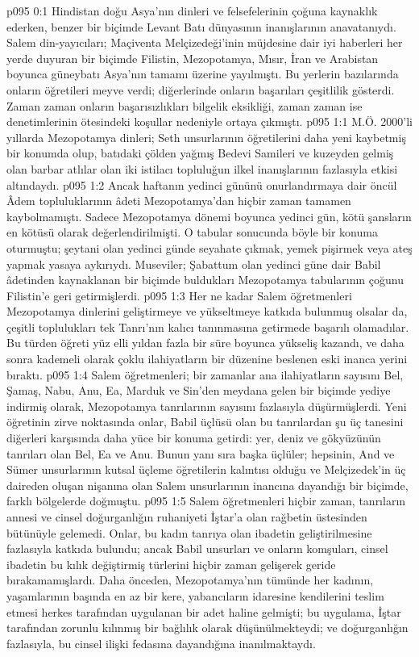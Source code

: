 \vs p095 0:1 Hindistan doğu Asya’nın dinleri ve felsefelerinin çoğuna kaynaklık ederken, benzer bir biçimde Levant Batı dünyasının inanışlarının anavatanıydı. Salem din\hyp{}yayıcıları; Maçiventa Melçizedeği’inin müjdesine dair iyi haberleri her yerde duyuran bir biçimde Filistin, Mezopotamya, Mısır, İran ve Arabistan boyunca güneybatı Asya’nın tamamı üzerine yayılmıştı. Bu yerlerin bazılarında onların öğretileri meyve verdi; diğerlerinde onların başarıları çeşitlilik gösterdi. Zaman zaman onların başarısızlıkları bilgelik eksikliği, zaman zaman ise denetimlerinin ötesindeki koşullar nedeniyle ortaya çıkmıştı.
\vs p095 1:1 M.Ö. 2000’li yıllarda Mezopotamya dinleri; Seth unsurlarının öğretilerini daha yeni kaybetmiş bir konumda olup, batıdaki çölden yağmış Bedevi Samileri ve kuzeyden gelmiş olan barbar atlılar olan iki istilacı topluluğun ilkel inanışlarının fazlasıyla etkisi altındaydı.
\vs p095 1:2 Ancak haftanın yedinci gününü onurlandırmaya dair öncül Âdem topluluklarının âdeti Mezopotamya’dan hiçbir zaman tamamen kaybolmamıştı. Sadece Mezopotamya dönemi boyunca yedinci gün, kötü şansların en kötüsü olarak değerlendirilmişti. O tabular sonucunda böyle bir konuma oturmuştu; şeytani olan yedinci günde seyahate çıkmak, yemek pişirmek veya ateş yapmak yasaya aykırıydı. Museviler; Şabattum olan yedinci güne dair Babil âdetinden kaynaklanan bir biçimde buldukları Mezopotamya tabularının çoğunu Filistin’e geri getirmişlerdi.
\vs p095 1:3 Her ne kadar Salem öğretmenleri Mezopotamya dinlerini geliştirmeye ve yükseltmeye katkıda bulunmuş olsalar da, çeşitli toplulukları tek Tanrı’nın kalıcı tanınmasına getirmede başarılı olamadılar. Bu türden öğreti yüz elli yıldan fazla bir süre boyunca yükseliş kazandı, ve daha sonra kademeli olarak çoklu ilahiyatların bir düzenine beslenen eski inanca yerini bıraktı.
\vs p095 1:4 Salem öğretmenleri; bir zamanlar ana ilahiyatların sayısını Bel, Şamaş, Nabu, Anu, Ea, Marduk ve Sin’den meydana gelen bir biçimde yediye indirmiş olarak, Mezopotamya tanrılarının sayısını fazlasıyla düşürmüşlerdi. Yeni öğretinin zirve noktasında onlar, Babil üçlüsü olan bu tanrılardan şu üç tanesini diğerleri karşısında daha yüce bir konuma getirdi: yer, deniz ve gökyüzünün tanrıları olan Bel, Ea ve Anu. Bunun yanı sıra başka üçlüler; hepsinin, And ve Sümer unsurlarının kutsal üçleme öğretilerin kalıntısı olduğu ve Melçizedek’in üç daireden oluşan nişanına olan Salem unsurlarının inancına dayandığı bir biçimde, farklı bölgelerde doğmuştu.
\vs p095 1:5 Salem öğretmenleri hiçbir zaman, tanrıların annesi ve cinsel doğurganlığın ruhaniyeti İştar’a olan rağbetin üstesinden bütünüyle gelemedi. Onlar, bu kadın tanrıya olan ibadetin geliştirilmesine fazlasıyla katkıda bulundu; ancak Babil unsurları ve onların komşuları, cinsel ibadetin bu kılık değiştirmiş türlerini hiçbir zaman gelişerek geride bırakamamışlardı. Daha önceden, Mezopotamya’nın tümünde her kadının, yaşamlarının başında en az bir kere, yabancıların idaresine kendilerini teslim etmesi herkes tarafından uygulanan bir adet haline gelmişti; bu uygulama, İştar tarafından zorunlu kılınmış bir bağlılık olarak düşünülmekteydi; ve doğurganlığın fazlasıyla, bu cinsel ilişki fedasına dayandığına inanılmaktaydı.
